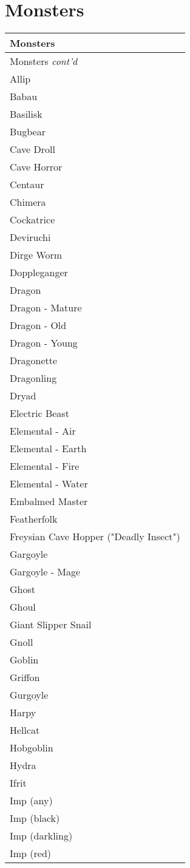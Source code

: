 \documentclass[twoside]{book}
\begin{document}
    

\section{Monsters}
    
\begin{longtable}{p{1.25in}} 
  Monsters\\
  \hline
  \hline
  \endfirsthead
  Monsters \textit{cont'd}
         \\
  \hline
  \endhead
\raggedright Allip \tabularnewline
      \raggedright Babau \tabularnewline
      \raggedright Basilisk \tabularnewline
      \raggedright Bugbear \tabularnewline
      \raggedright Cave Droll \tabularnewline
      \raggedright Cave Horror \tabularnewline
      \raggedright Centaur \tabularnewline
      \raggedright Chimera \tabularnewline
      \raggedright Cockatrice \tabularnewline
      \raggedright Deviruchi \tabularnewline
      \raggedright Dirge Worm \tabularnewline
      \raggedright Doppleganger \tabularnewline
      \raggedright Dragon \tabularnewline
      \raggedright Dragon - Mature \tabularnewline
      \raggedright Dragon - Old \tabularnewline
      \raggedright Dragon - Young \tabularnewline
      \raggedright Dragonette \tabularnewline
      \raggedright Dragonling \tabularnewline
      \raggedright Dryad \tabularnewline
      \raggedright Electric Beast \tabularnewline
      \raggedright Elemental - Air \tabularnewline
      \raggedright Elemental - Earth \tabularnewline
      \raggedright Elemental - Fire \tabularnewline
      \raggedright Elemental - Water \tabularnewline
      \raggedright Embalmed Master \tabularnewline
      \raggedright Featherfolk \tabularnewline
      \raggedright Freysian Cave Hopper ("Deadly
           Insect") \tabularnewline
      \raggedright Gargoyle \tabularnewline
      \raggedright Gargoyle - Mage \tabularnewline
      \raggedright Ghost \tabularnewline
      \raggedright Ghoul \tabularnewline
      \raggedright Giant Slipper Snail \tabularnewline
      \raggedright Gnoll \tabularnewline
      \raggedright Goblin \tabularnewline
      \raggedright Griffon \tabularnewline
      \raggedright Gurgoyle \tabularnewline
      \raggedright Harpy \tabularnewline
      \raggedright Hellcat \tabularnewline
      \raggedright Hobgoblin \tabularnewline
      \raggedright Hydra \tabularnewline
      \raggedright Ifrit \tabularnewline
      \raggedright Imp (any) \tabularnewline
      \raggedright Imp (black) \tabularnewline
      \raggedright Imp (darkling) \tabularnewline
      \raggedright Imp (red) \tabularnewline

\end{longtable}
\end{document}
